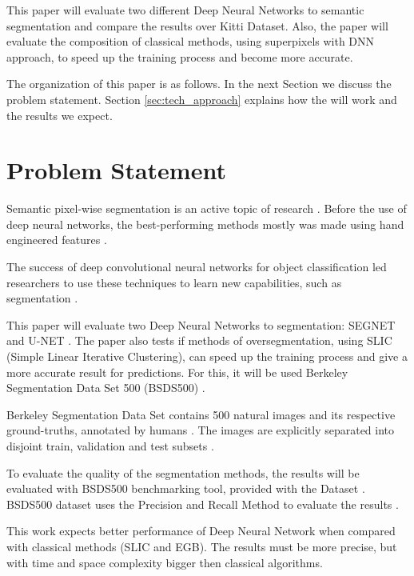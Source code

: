 \documentclass[10pt,twocolumn,letterpaper]{article}
\begin{document}
This paper will evaluate two different Deep Neural Networks to semantic segmentation and compare the results over Kitti Dataset. Also, the paper will evaluate the composition of classical methods, using superpixels with DNN approach, to speed up the training process and become more accurate.

The organization of this paper is as follows. In the next Section we discuss the problem statement. Section \ref{sec:tech_approach} explains how the will work and the results we expect.

\section{Problem Statement} \label{sec:prob_statement}


Semantic pixel-wise segmentation is an active topic of research \cite{SEGNET}. Before the use of deep neural networks, the  best-performing methods mostly was made using hand engineered features \cite{SEGNET}.

The success of deep convolutional neural networks for object classification led researchers to use these techniques to learn new capabilities, such as segmentation \cite{SEGNET}. 

This paper will evaluate two Deep Neural Networks to segmentation: SEGNET \cite{SEGNET} and U-NET \cite{UNET}. The paper also tests if methods of oversegmentation, using SLIC (Simple Linear Iterative Clustering), can speed up the training process and give a more accurate result for predictions. For this, it will be used Berkeley Segmentation Data Set 500 (BSDS500) \cite{BSDS500}.

Berkeley Segmentation Data Set contains 500 natural images and its respective ground-truths, annotated by humans \cite{BSDS500}. The images are explicitly separated into disjoint train, validation and test subsets \cite{BSDS500}.

To evaluate the quality of the segmentation methods, the results will be evaluated with BSDS500 benchmarking tool, provided with the Dataset \cite{BSDS500}. BSDS500 dataset uses the Precision and Recall Method to evaluate the results \cite{BSDS500}.

This work expects better performance of Deep Neural Network when compared with classical methods (SLIC and EGB). The results must be more precise, but with time and space complexity bigger then classical algorithms. 
\end{document}
